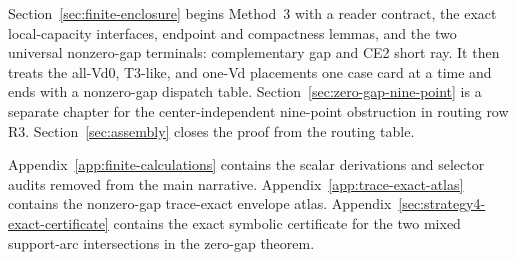 Section~\ref{sec:finite-enclosure} begins Method~3 with a reader contract,
the exact local-capacity interfaces, endpoint and compactness lemmas, and the
two universal nonzero-gap terminals: complementary gap and CE2 short ray.
It then treats the all-Vd0, T3-like, and one-Vd placements one case card at a
time and ends with a nonzero-gap dispatch table.
Section~\ref{sec:zero-gap-nine-point} is a separate chapter for the
center-independent nine-point obstruction in routing row R3.
Section~\ref{sec:assembly} closes the proof from the routing table.

Appendix~\ref{app:finite-calculations} contains the scalar derivations and
selector audits removed from the main narrative.  Appendix~\ref{app:trace-exact-atlas}
contains the nonzero-gap trace-exact envelope atlas.  Appendix~\ref{sec:strategy4-exact-certificate}
contains the exact symbolic certificate for the two mixed support-arc
intersections in the zero-gap theorem.
